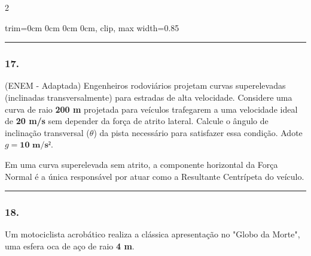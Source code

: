 \documentclass[twoside, 10pt, a4paper]{article}
\newlength{\espacoPreQuestao}\setlength{\espacoPreQuestao}{0.1cm}
\newlength{\espacoQuestao}\setlength{\espacoQuestao}{0.2cm}
\newcommand{\larguraTikz}{0.85\linewidth}
\begin{document}
\begin{multicols*}{2}
\begin{center}
\begin{adjustbox}{trim=0cm 0cm 0cm 0cm, clip, max width=\larguraTikz}
\end{adjustbox}
\end{center}
\par\vspace{\espacoQuestao}

\noindent\textcolor{CorLinha}{\rule{\linewidth}{0.5pt}} 
\par\vspace{\espacoPreQuestao}
\subsubsection*{17.} (ENEM - Adaptada) Engenheiros rodoviários projetam curvas superelevadas (inclinadas transversalmente) para estradas de alta velocidade. Considere uma curva de raio \textbf{200 m} projetada para veículos trafegarem a uma velocidade ideal de \textbf{20 m/s} sem depender da força de atrito lateral. Calcule o ângulo de inclinação transversal ($\theta$) da pista necessário para satisfazer essa condição. Adote $g = \textbf{10 m/s²}$.
\par\vspace{\espacoQuestao}

\begin{boxdica}
Em uma curva superelevada sem atrito, a componente horizontal da Força Normal é a única responsável por atuar como a Resultante Centrípeta do veículo.
\end{boxdica}
\par\vspace{\espacoQuestao}

\noindent\textcolor{CorLinha}{\rule{\linewidth}{0.5pt}} 
\par\vspace{\espacoPreQuestao}
\subsubsection*{18.} Um motociclista acrobático realiza a clássica apresentação no "Globo da Morte", uma esfera oca de aço de raio \textbf{4 m}. 


\end{multicols*}
\end{document}
